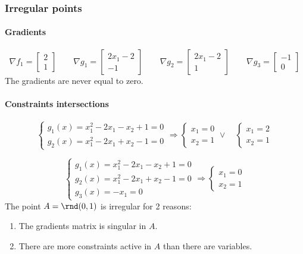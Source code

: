 \documentclass[\main/main.tex]{subfiles}
\begin{document}
\subsubsection*{Irregular points}

\paragraph*{Gradients}

\[
  \nabla f_1 = \begin{bmatrix}
    2 \\
    1
  \end{bmatrix}
  \qquad
  \nabla g_1 = \begin{bmatrix}
    2x_1 -2 \\
    -1
  \end{bmatrix}
  \qquad
  \nabla g_2 = \begin{bmatrix}
    2x_1 -2 \\
    1
  \end{bmatrix}
  \qquad
  \nabla g_3 = \begin{bmatrix}
    -1 \\
    0
  \end{bmatrix}
\]
The gradients are never equal to zero.

\paragraph*{Constraints intersections}

\[
  \begin{cases}
    g_1(x) = x_1^2 - 2x_1 - x_2 + 1 = 0 \\
    g_2(x) = x_1^2 - 2x_1 + x_2 -1  = 0
  \end{cases}
  \Rightarrow
  \begin{cases}
    x_1 = 0 \\
    x_2 = 1
  \end{cases}
  \lor
  \quad
  \begin{cases}
    x_1 = 2 \\
    x_2 = 1
  \end{cases}
\]

\[
  \begin{cases}
    g_1(x) = x_1^2 - 2x_1 - x_2 + 1 = 0 \\
    g_2(x) = x_1^2 - 2x_1 + x_2 -1  = 0 \\
    g_3(x) = -x_1                   = 0
  \end{cases}
  \Rightarrow
  \begin{cases}
    x_1 = 0 \\
    x_2 = 1
  \end{cases}
\]
The point $A = \rnd(0,1)$ is irregular for 2 reasons:
\begin{enumerate}
  \item The gradients matrix is singular in $A$.
  \item There are more constraints active in $A$ than there are variables.
\end{enumerate}
\end{document}
